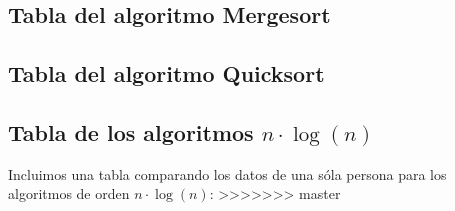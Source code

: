\documentclass[a4paper, 11pt]{article}
\begin{document}
\subsection{Tabla del algoritmo Mergesort}

\subsection{Tabla del algoritmo Quicksort}


\subsection{Tabla de los algoritmos $n\cdot \log(n)$}

Incluimos una tabla comparando los datos de una sóla persona para los algoritmos
de orden $n\cdot \log(n)$:
>>>>>>> master
\end{document}
